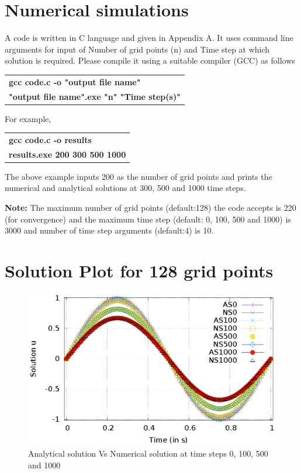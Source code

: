 \documentclass[12pt]{article}
\begin{document}
	\section{Numerical simulations}
	
	A code is written in C language and given in Appendix A. It uses command line arguments for input of Number of grid points (n) and Time step at which solution is required. Please compile it using a suitable compiler (GCC) as follows	
	\begin{center}
		\begin{tabular}{l}
			\textbf{gcc code.c -o "output file name"} \\
			\textbf{"output file name".exe "n" "Time step(s)"}
		\end{tabular}
	\end{center}
	
	For example,
	
	\begin{center}
		\begin{tabular}{l}
			\textbf{gcc code.c -o results} \\
			\textbf{results.exe 200 300 500 1000}
		\end{tabular}
	\end{center}

	The above example inputs 200 as the number of grid points and prints the numerical and analytical solutions at 300, 500 and 1000 time steps. 

	\textbf{Note:} The maximum number of grid points (default:128) the code accepts is 220 (for convergence) and the maximum time step (default: 0, 100, 500 and 1000) is 3000 and number of time step arguments (default:4) is 10.
	
	\newpage
	
	\section{Solution Plot for 128 grid points}
	
	\begin{figure}[h]
		\centering
	\includegraphics[scale=1.05, angle=90]{"Gnuplot/NSvsAS_plot_for_128_grid_points.eps"}
	\caption{Analytical solution Vs Numerical solution at time steps 0, 100, 500 and 1000}	
	\end{figure}
			
\end{document}

